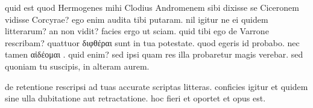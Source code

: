 


 quid est quod Hermogenes mihi Clodius Andromenem sibi dixisse se Ciceronem vidisse Corcyrae? ego enim audita tibi putaram. nil igitur ne ei quidem litterarum? an non vidit? facies ergo ut sciam. quid tibi ego de Varrone rescribam? quattuor διφθέραι sunt in tua potestate. quod egeris id probabo. nec tamen αἰδέομαι . quid enim? sed ipsi quam res illa probaretur magis verebar. sed quoniam tu suscipis, in alteram aurem.

 de retentione rescripsi ad tuas accurate scriptas litteras. conficies igitur et quidem sine ulla dubitatione aut retractatione. hoc fieri et oportet et opus est.
